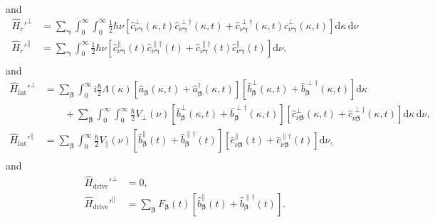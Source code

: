\documentclass{article}
\begin{document}
and
\begin{equation}
\begin{split}
\hat{H}_r'^\perp &= \sum_{\bm{\gamma}}\int_0^\infty\int_0^\infty\frac{1}{2}\hbar\nu\left[\hat{c}_{\nu\bm{\gamma}}^\perp(\kappa,t)\hat{c}_{\nu\bm{\gamma}}^{\perp\dagger}(\kappa,t) + \hat{c}_{\nu\bm{\gamma}}^{\perp\dagger}(\kappa,t)\hat{c}_{\nu\bm{\gamma}}^\perp(\kappa,t)\right]\mathrm{d}\kappa\,\mathrm{d}\nu\\
\hat{H}_r'^\parallel &= \sum_{\bm{\gamma}}\int_0^\infty\frac{1}{2}\hbar\nu\left[\hat{c}_{\nu\bm{\gamma}}^\parallel(t)\hat{c}_{\nu\bm{\gamma}}^{\parallel\dagger}(t) + \hat{c}_{\nu\bm{\gamma}}^{\parallel\dagger}(t)\hat{c}_{\nu\bm{\gamma}}^\parallel(t)\right]\mathrm{d}\nu,\\
\end{split}
\end{equation}
and
\begin{equation}
\begin{split}
\hat{H}_\mathrm{int}'^\perp &=  \sum_{\bm{\beta}}\int_0^\infty\mathrm{i}\frac{\hbar}{2}\Lambda(\kappa)\left[\hat{a}_{\bm{\beta}}(\kappa,t) + \hat{a}_{\bm{\beta}}^\dagger(\kappa,t)\right]\left[\hat{b}_{\bm{\beta}}^\perp(\kappa,t) + \hat{b}_{\bm{\beta}}^{\perp\dagger}(\kappa,t)\right]\mathrm{d}\kappa\\
&\qquad + \sum_{\bm{\beta}}\int_0^\infty\int_0^\infty\frac{\hbar}{2}V_\perp(\nu)\left[\hat{b}_{\bm{\beta}}^\perp(\kappa,t) + \hat{b}_{\bm{\beta}}^{\perp\dagger}(\kappa,t)\right]\left[\hat{c}_{\nu\bm{\beta}}^\perp(\kappa,t) + \hat{c}_{\nu\bm{\beta}}^{\perp\dagger}(\kappa,t)\right]\mathrm{d}\kappa\,\mathrm{d}\nu,\\[1.0em]
\hat{H}_\mathrm{int}'^\parallel &=  \sum_{\bm{\beta}}\int_0^\infty\frac{\hbar}{2}V_\parallel(\nu)\left[\hat{b}_{\bm{\beta}}^\parallel(t) + \hat{b}_{\bm{\beta}}^{\parallel\dagger}(t)\right]\left[\hat{c}_{\nu\bm{\beta}}^\parallel(t) + \hat{c}_{\nu\bm{\beta}}^{\parallel\dagger}(t)\right]\mathrm{d}\nu,\\
\end{split}
\end{equation}
and
\begin{equation}
\begin{split}
\hat{H}_\mathrm{drive}'^\perp &= 0,\\
\hat{H}_\mathrm{drive}'^\parallel &= \sum_{\bm{\beta}}F_{\bm{\beta}}(t)\left[\hat{b}_{\bm{\beta}}^\parallel(t) + \hat{b}_{\bm{\beta}}^{\parallel\dagger}(t)\right].
\end{split}
\end{equation}
\end{document}
